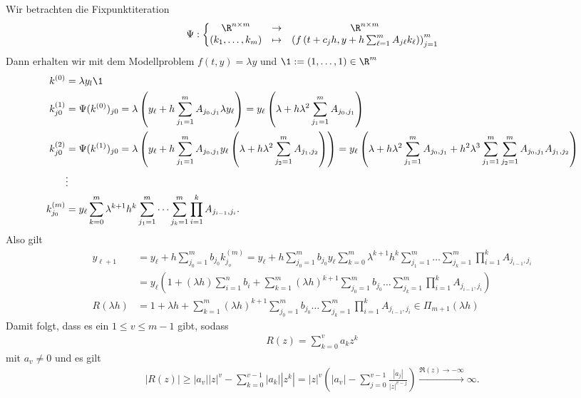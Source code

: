 \begin{solution}
Wir betrachten die Fixpunktiteration
\begin{align*}
  \Psi: \bigg\{\begin{matrix}
    \R^{n \times m} & \rightarrow & \R^{n \times m} \\
    (k_1,\dots,k_m) & \mapsto & \left(f\left(t + c_jh,y + h\sum_{\ell = 1}^m A_{j\ell}k_{\ell}\right)\right)_{j=1}^m
  \end{matrix}
\end{align*}
Dann erhalten wir mit dem Modellproblem $f(t,y) = \lambda y$ und $\1 := (1,\dots,1) \in \R^m$
\begin{align*}
  k^{(0)} &= \lambda y_l \1 \\
  k^{(1)}_{j0} &= \Psi(k^{(0)})_{j0}
  = \lambda\left(y_{\ell} + h\sum_{j_1 = 1}^mA_{j_0,j_1}\lambda y_{\ell}\right)
  = y_{\ell}\left(\lambda + h\lambda^2\sum_{j_1 = 1}^mA_{j_0,j_1}\right) \\
  k^{(2)}_{j0} &= \Psi(k^{(1)})_{j0}
  = \lambda\left(y_{\ell} + h\sum_{j_1 = 1}^mA_{j_0,j_1}y_{\ell}\left(\lambda + h\lambda^2
  \sum_{j_2 = 1}^mA_{j_1,j_2}\right)\right)
  = y_{\ell}\left(\lambda + h\lambda^2\sum_{j_1 = 1}^mA_{j_0,j_1}
  + h^2\lambda^3\sum_{j_1 = 1}^m\sum_{j_2 = 1}^m A_{j_0,j_1}A_{j_1,j_2}\right) \\
  &\vdots \\
  k^{(m)}_{j_0} &= y_{\ell}\sum_{k = 0}^m \lambda^{k+1}h^k\sum_{j_1 = 1}^m\dots\sum_{j_{k} = 1}^m
  \prod_{i=1}^k A_{j_{i-1}, j_i}.
\end{align*}
Also gilt
\begin{align*}
  y_{\ell+1} &= y_\ell + h\sum_{j_0 = 1}^{m} b_{j_0}k_{j_o}^{(m)} =
  y_\ell + h\sum_{j_0 = 1}^{m} b_{j_0}y_{\ell}\sum_{k = 0}^m \lambda^{k+1}h^k\sum_{j_1 = 1}^m\dots\sum_{j_{k} = 1}^m
  \prod_{i=1}^k A_{j_{i-1}, j_i} \\
  &= y_{\ell}\left(1 + (\lambda h)\sum_{i=1}^nb_i + \sum_{k=1}^m(\lambda h)^{k+1}
  \sum_{j_0 = 1}^mb_{j_0}\dots\sum_{j_k = 1}^m \prod_{i=1}^k A_{j_{i-1},j_i}\right) \\
  R(\lambda h) &= 1 + \lambda h + \sum_{k=1}^m(\lambda h)^{k+1}
  \sum_{j_0 = 1}^mb_{j_0}\dots\sum_{j_k = 1}^m \prod_{i=1}^k A_{j_{i-1},j_i}
  \in \Pi_{m+1}(\lambda h)
\end{align*}
Damit folgt, dass es ein $1 \leq v \leq m - 1$ gibt, sodass
\begin{align*}
  R(z) = \sum_{k= 0}^v a_kz^k
\end{align*}
mit $a_v \neq 0$ und es gilt
\begin{align*}
  |R(z)| \geq |a_v||z|^v - \sum_{k=0}^{v-1}|a_k||z^k|
  = |z|^v\left(|a_v| - \sum_{j = 0}^{v - 1}\frac{|a_j|}{|z|^{v - j}}\right)
  \stackrel{\Re(z) \rightarrow -\infty}{\longrightarrow} \infty.
\end{align*}
\end{solution}
